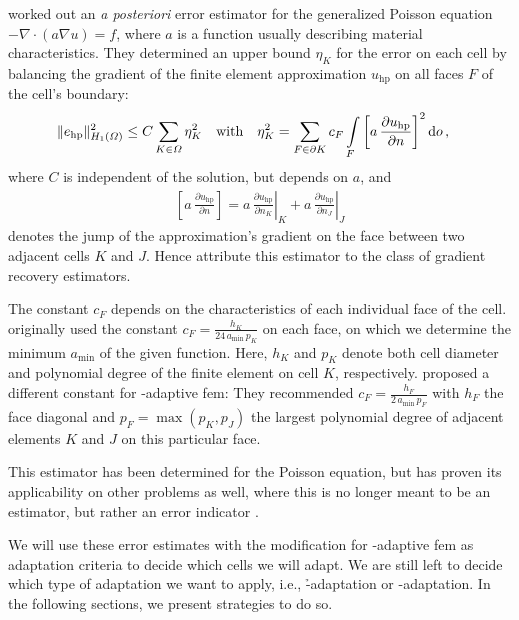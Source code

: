 \textcite{kelly1983} worked out an \textit{a posteriori} error estimator for the generalized Poisson equation $-\nabla \cdot \left( a \nabla u \right) = f$, where $a$ is a function usually describing material characteristics. They determined an upper bound $\eta_K$ for the error on each cell by balancing the gradient of the finite element approximation $u_\text{hp}$ on all faces $F$ of the cell's boundary:
\begin{align}
\label{eq:kelly} \|e_\text{hp}\|_{H_1(\Omega)}^2 &\leq C \sum\limits_{K \in \Omega} \eta_K^2 &&\text{with}&  \eta_K^2 &= \sum\limits_{F \in \partial K} c_F \int\limits_{F} \left[ a \, \frac{\partial u_\text{hp}}{\partial n} \right]^2 \mathop{}\!\mathrm{d}o \,\text{,}
\end{align}
where $C$ is independent of the solution, but depends on $a$, and
\begin{align*}
\left[ a \, \frac{\partial u_\text{hp}}{\partial n} \right] = \left. a \, \frac{\partial u_\text{hp}}{\partial n_K} \right|_K + \left. a \, \frac{\partial u_\text{hp}}{\partial n_J}\right|_J
\end{align*}
denotes the jump of the approximation's gradient on the face between two adjacent cells $K$ and $J$. Hence \textcite{ainsworth1997a} attribute this estimator to the class of gradient recovery estimators.

The constant $c_F$ depends on the characteristics of each individual face of the cell. \textcite{kelly1983} originally used the constant $c_F = \frac{h_K}{24 \, a_\text{min} \, p_K}$ on each face, on which we determine the minimum $a_\text{min}$ of the given function. Here, $h_K$ and $p_K$ denote both cell diameter and polynomial degree of the finite element on cell $K$, respectively. \textcite{davydov2017} proposed a different constant for \hp-adaptive \gls{fem}: They recommended $c_F = \frac{h_F}{2 \, a_\text{min} \, p_F}$ with $h_F$ the face diagonal and $p_F = \max\left(p_K, p_J\right)$ the largest polynomial degree of adjacent elements $K$ and $J$ on this particular face.

This estimator has been determined for the Poisson equation, but has proven its applicability on other problems as well, where this is no longer meant to be an estimator, but rather an error indicator \cite{dealiikelly}.

We will use these error estimates with the modification for \hp-adaptive \gls{fem} as adaptation criteria to decide which cells we will adapt. We are still left to decide which type of adaptation we want to apply, i.e., \h-adaptation or \p-adaptation. In the following sections, we present strategies to do so.




